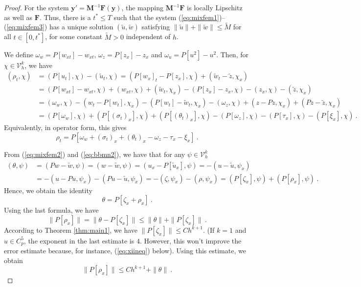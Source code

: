 \documentclass{amsart}
\newcommand{\by}{\mathbf{y}}
\newcommand{\bF}{\mathbf{F}}
\newcommand{\bM}{\mathbf{M}}
\begin{document}
\begin{proof}
For the system $\by'=\bM^{-1}\bF(\by)$, the mapping $\bM^{-1}\bF$ is locally Lipschitz as well as $\bF$. Thus, there is a $t^\ast\leq T$ such that the system (\ref{eq:mixfem1})--(\ref{eq:mixfem3}) has a unique solution $(\tilde{u}, \tilde{w})$ satisfying
$\|\tilde{u}\|+\|\tilde{w}\|\leq \tilde{M}$ for all $t\in [0,t^\ast]$, for some constant $\tilde{M}>0$ independent of $h$.

We define $\omega_w=P[w_{xt}]-w_{xt}$, $\omega_z=P[z_x]-z_x$ and $\omega_u=P[u^2]-u^2$. Then, for $\chi\in\mathcal{V}_h^k$, we have 
$$
\begin{aligned}
    (\rho_t,\chi) &= (P[u_t],\chi)-(\tilde{u}_t,\chi)= (P[w_x]_t-P [z_x],\chi) + (\tilde{w}_t-\tilde{z},\chi_x)\\
 &=(P[w_{xt}]-w_{xt},\chi)+(w_{xt},\chi)+(\tilde{w}_t,\chi_x)-(P[z_x]-z_x,\chi)-(z_x,\chi)-(\tilde{z},\chi_x)\\
 &=(\omega_w,\chi)-(w_t-P[w_t],\chi_x)-(P[w_t]-\tilde{w}_t,\chi_x)-(\omega_z,\chi)+(z-Pz,\chi_x)+(Pz-\tilde{z},\chi_x)\\
 &=(P[\omega_w],\chi)+(P[{(\sigma_t)}_x],\chi)+(P[{(\theta_t)}_x],\chi)-(P[\omega_z],\chi)-(P[\tau_x],\chi)-(P[\xi_x],\chi)\ .
\end{aligned}
$$
Equivalently, in operator form, this gives
\begin{equation}\label{eq:rhot}
\rho_t=P[\omega_w+(\sigma_t)_x+(\theta_t)_x-\omega_z-\tau_x-\xi_x]\ .
\end{equation}

From (\ref{eq:mixfem2}) and (\ref{eq:bbmn2}), we have that for any $\psi\in\mathcal{V}_h^k$
$$
\begin{aligned}
(\theta,\psi)&=(Pw-\tilde{w},\psi) = (w-\tilde{w},\psi)= (u_x-P[\tilde{u}_x],\psi)
= -(u-\tilde{u},\psi_x)\\
&= -(u-Pu,\psi_x)-(Pu-\tilde{u},\psi_x)
=  -(\zeta,\psi_x)-(\rho,\psi_x)=  (P[\zeta_x],\psi)+(P[\rho_x],\psi)\ .
\end{aligned}$$
Hence, we obtain the identity
\begin{equation}\label{eq:thetaP}
\theta=P[\zeta_x+\rho_x]\ .
\end{equation}
%
Using the last formula, we have
%
$$
\|P[\rho_x]\| =\|\theta-P[\zeta_x]\|\leq \|\theta\|+\|P[\zeta_x]\|\ .
$$
According to Theorem \ref{thm:main1}, we have $\|P[\zeta_x]\|\leq Ch^{k+1}$. (If $k=1$ and $u\in C_p^5$, the exponent in the last estimate is $4$. However, this won’t improve the error estimate because, for instance, (\ref{eq:xiineq}) below). 
%
Using this estimate, we obtain
\begin{equation}\label{eq:Prhox}
\|P[\rho_x]\|\leq Ch^{k+1}+\|\theta\|\ .
\end{equation}


\end{proof}
\end{document}
